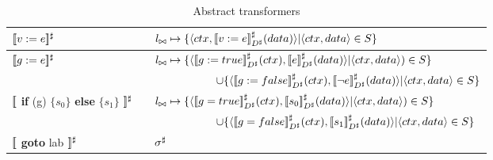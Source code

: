 \begin{table}
\footnotesize
\renewcommand{\arraystretch}{1.4}
\begin{tabular}{lcl}
\hline
$\lbrack\!\lbrack v:=e \rbrack\!\rbrack^{\sharp}$ & \hspace{0.1in} & $l_{\bowtie} \mapsto \{\langle ctx,\lbrack\!\lbrack v:=e \rbrack\!\rbrack^{\sharp}_{D^\sharp}(data) \rangle | \langle ctx,data \rangle \in S \}$
\\
\hline
$\lbrack\!\lbrack g:=e \rbrack\!\rbrack^{\sharp}$ & & $l_{\bowtie} \mapsto \{\langle \lbrack\!\lbrack g:=true \rbrack\!\rbrack^{\sharp}_{D^\sharp}(ctx),\lbrack\!\lbrack e \rbrack\!\rbrack^{\sharp}_{D^\sharp}(data) \rangle  | \langle ctx,data \rangle) \in S \}$ \\
& & ~~~~~~~~~~~$\cup \{ \langle \lbrack\!\lbrack g:=false \rbrack\!\rbrack^{\sharp}_{D^\sharp}(ctx),\lbrack\!\lbrack \neg e \rbrack\!\rbrack^{\sharp}_{D^\sharp}(data) \rangle | \langle ctx, data \rangle \in S \}$
\\ \hline
$\lbrack\!\lbrack$ \textbf{if} (g) $\{s_{0}\}$ \textbf{else} $\{s_{1}\}$ $\rbrack\!\rbrack^{\sharp}$ & &
$l_{\bowtie} \mapsto \{\langle\lbrack\!\lbrack g=true \rbrack\!\rbrack^{\sharp}_{D^\sharp}(ctx),  \lbrack\!\lbrack s_0 \rbrack\!\rbrack^{\sharp}_{D^\sharp}(data) \rangle | \langle ctx,data \rangle) \in S \}$ \\
& & ~~~~~~~~~~~$\cup \{\langle \lbrack\!\lbrack g=false \rbrack\!\rbrack^{\sharp}_{D^\sharp}(ctx), \lbrack\!\lbrack s_1 \rbrack\!\rbrack^{\sharp}_{D^\sharp}(data) \rangle | \langle ctx,data \rangle \in S \}$
\\ \hline
$\lbrack\!\lbrack$ \textbf{goto} lab $\rbrack\!\rbrack^{\sharp}$ & & $\sigma^\sharp$
\\ \hline
\end{tabular}
\renewcommand{\arraystretch}{1}
\caption{Abstract transformers}\label{Ta:AbsTrans}
\end{table}
